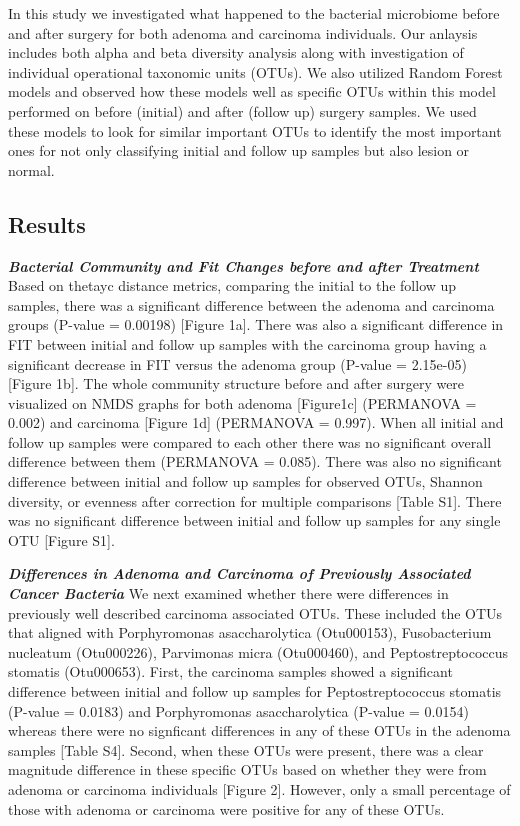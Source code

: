 \documentclass[12pt,]{article}
\begin{document}
In this study we investigated what happened to the bacterial microbiome
before and after surgery for both adenoma and carcinoma individuals. Our
anlaysis includes both alpha and beta diversity analysis along with
investigation of individual operational taxonomic units (OTUs). We also
utilized Random Forest models and observed how these models well as
specific OTUs within this model performed on before (initial) and after
(follow up) surgery samples. We used these models to look for similar
important OTUs to identify the most important ones for not only
classifying initial and follow up samples but also lesion or normal.

\newpage

\subsection{Results}\label{results}

\textbf{\emph{Bacterial Community and Fit Changes before and after
Treatment}} Based on thetayc distance metrics, comparing the initial to
the follow up samples, there was a significant difference between the
adenoma and carcinoma groups (P-value = 0.00198) {[}Figure 1a{]}. There
was also a significant difference in FIT between initial and follow up
samples with the carcinoma group having a significant decrease in FIT
versus the adenoma group (P-value = 2.15e-05) {[}Figure 1b{]}. The whole
community structure before and after surgery were visualized on NMDS
graphs for both adenoma {[}Figure1c{]} (PERMANOVA = 0.002) and carcinoma
{[}Figure 1d{]} (PERMANOVA = 0.997). When all initial and follow up
samples were compared to each other there was no significant overall
difference between them (PERMANOVA = 0.085). There was also no
significant difference between initial and follow up samples for
observed OTUs, Shannon diversity, or evenness after correction for
multiple comparisons {[}Table S1{]}. There was no significant difference
between initial and follow up samples for any single OTU {[}Figure
S1{]}.

\textbf{\emph{Differences in Adenoma and Carcinoma of Previously
Associated Cancer Bacteria}} We next examined whether there were
differences in previously well described carcinoma associated OTUs.
These included the OTUs that aligned with Porphyromonas asaccharolytica
(Otu000153), Fusobacterium nucleatum (Otu000226), Parvimonas micra
(Otu000460), and Peptostreptococcus stomatis (Otu000653). First, the
carcinoma samples showed a significant difference between initial and
follow up samples for Peptostreptococcus stomatis (P-value = 0.0183) and
Porphyromonas asaccharolytica (P-value = 0.0154) whereas there were no
signficant differences in any of these OTUs in the adenoma samples
{[}Table S4{]}. Second, when these OTUs were present, there was a clear
magnitude difference in these specific OTUs based on whether they were
from adenoma or carcinoma individuals {[}Figure 2{]}. However, only a
small percentage of those with adenoma or carcinoma were positive for
any of these OTUs.
\end{document}
